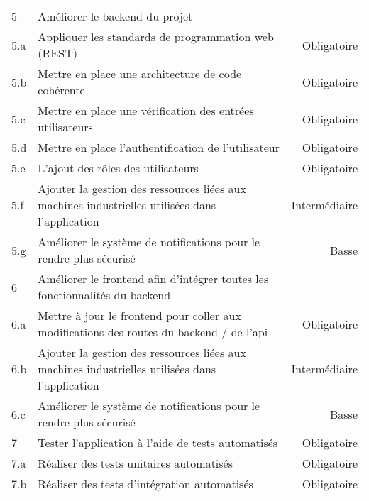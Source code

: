 \documentclass[
    iai, %
    il, %
]{heig-tb}
\begin{document}
\begin{table}[h]
\begin{center}
\begin{tabularx}{1.0\textwidth} {l|X|r}
            5   & Améliorer le backend du projet                                                                                         &               \\
            5.a & Appliquer les standards de programmation web (REST)                                                                    & Obligatoire   \\
            5.b & Mettre en place une architecture de code cohérente                                                                     & Obligatoire   \\
            5.c & Mettre en place une vérification des entrées utilisateurs                                                              & Obligatoire   \\
            5.d & Mettre en place l'authentification de l'utilisateur                                                                    & Obligatoire   \\
            5.e & L'ajout des rôles des utilisateurs                                                                                     & Obligatoire   \\
            5.f & Ajouter la gestion des ressources liées aux machines industrielles utilisées dans l'application                        & Intermédiaire \\
            5.g & Améliorer le système de notifications pour le rendre plus sécurisé                                                     & Basse         \\
            6   & Améliorer le frontend afin d'intégrer toutes les fonctionnalités du backend                                            &               \\
            6.a & Mettre à jour le frontend pour coller aux modifications des routes du backend / de l'api                               & Obligatoire   \\
            6.b & Ajouter la gestion des ressources liées aux machines industrielles utilisées dans l'application                        & Intermédiaire \\
            6.c & Améliorer le système de notifications pour le rendre plus sécurisé                                                     & Basse         \\
            7   & Tester l'application à l'aide de tests automatisés                                                                     & Obligatoire   \\
            7.a & Réaliser des tests unitaires automatisés                                                                               & Obligatoire   \\
            7.b & Réaliser des tests d'intégration automatisés                                                                           & Obligatoire   \\
        \end{tabularx}
    \end{center}
\end{table}
\end{document}
